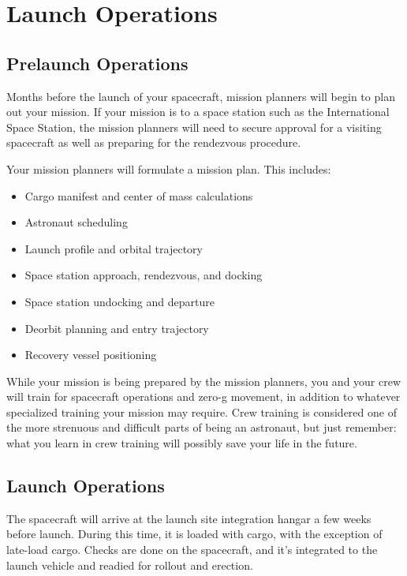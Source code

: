 \documentclass[oneside,a5paper]{book}
\begin{document}
\section{Launch Operations}

\subsection{Prelaunch Operations}

Months before the launch of your spacecraft, mission planners will begin to plan out your mission. If your mission is to a space station such as the International Space Station, the mission planners will need to secure approval for a visiting spacecraft as well as preparing for the rendezvous procedure.

Your mission planners will formulate a mission plan. This includes:

\begin{itemize}
\item Cargo manifest and center of mass calculations
\item Astronaut scheduling
\item Launch profile and orbital trajectory
\item Space station approach, rendezvous, and docking
\item Space station undocking and departure
\item Deorbit planning and entry trajectory
\item Recovery vessel positioning
\end{itemize}

While your mission is being prepared by the mission planners, you and
your crew will train for spacecraft operations and zero-g movement, in
addition to whatever specialized training your mission may
require. Crew training is considered one of the more strenuous and
difficult parts of being an astronaut, but just remember: what you
learn in crew training will possibly save your life in the future.

\subsection{Launch Operations}

The spacecraft will arrive at the launch site integration hangar a few
weeks before launch. During this time, it is loaded with cargo, with
the exception of late-load cargo. Checks are done on the spacecraft,
and it’s integrated to the launch vehicle and readied for rollout and
erection.
\end{document}
